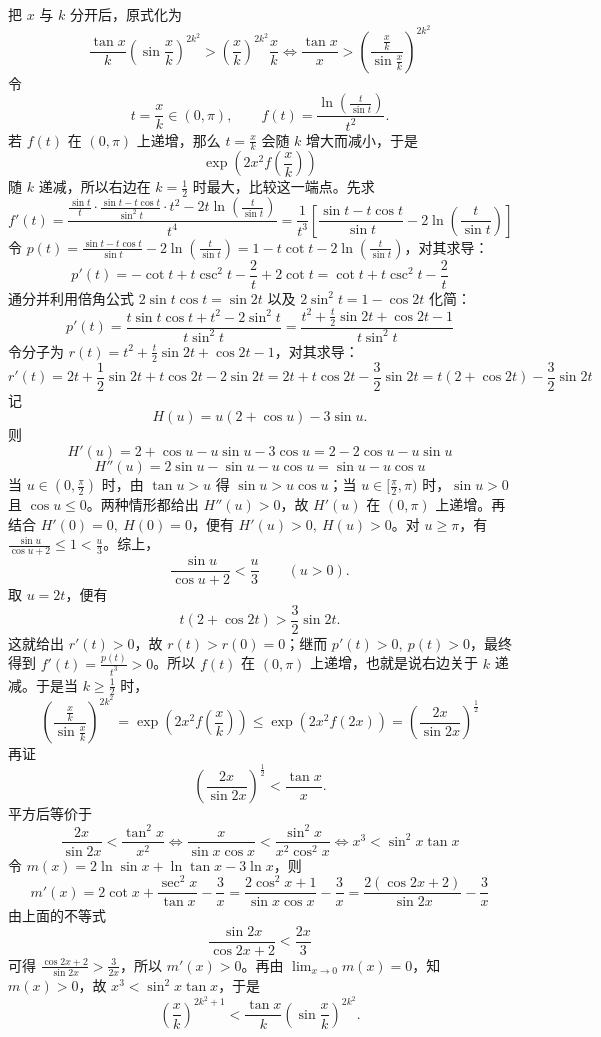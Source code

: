\begin{solution}
把 $x$ 与 $k$ 分开后，原式化为
$$ \frac{\tan x}{k} \left(\sin\frac{x}{k}\right)^{2k^2} > \left(\frac{x}{k}\right)^{2k^2} \frac{x}{k} \Leftrightarrow\frac{\tan x}{x} > \left( \frac{\frac{x}{k}}{\sin \frac{x}{k}} \right)^{2k^2} $$
令
\[
t=\frac{x}{k}\in(0,\pi),\qquad f(t)=\frac{\ln\left(\frac{t}{\sin t}\right)}{t^2}.
\]
若 $f(t)$ 在 $(0,\pi)$ 上递增，那么 $t=\frac{x}{k}$ 会随 $k$ 增大而减小，于是
\[
\exp\!\left(2x^2f\!\left(\frac{x}{k}\right)\right)
\]
随 $k$ 递减，所以右边在 $k=\frac12$ 时最大，比较这一端点。先求
$$ f'(t) = \frac{\frac{\sin t}{t} \cdot \frac{\sin t - t \cos t}{\sin^2 t} \cdot t^2 - 2t \ln\left(\frac{t}{\sin t}\right)}{t^4} = \frac{1}{t^3} \left[ \frac{\sin t - t \cos t}{\sin t} - 2 \ln\left(\frac{t}{\sin t}\right) \right] $$
令 $p(t) = \frac{\sin t - t \cos t}{\sin t} - 2 \ln\left(\frac{t}{\sin t}\right) = 1 - t \cot t - 2 \ln\left(\frac{t}{\sin t}\right)$，对其求导：
$$ p'(t) = -\cot t + t \csc^2 t - \frac{2}{t} + 2 \cot t = \cot t + t \csc^2 t - \frac{2}{t} $$
通分并利用倍角公式 $2\sin t \cos t = \sin 2t$ 以及 $2\sin^2 t = 1 - \cos 2t$ 化简：
$$ p'(t) = \frac{t \sin t \cos t + t^2 - 2 \sin^2 t}{t \sin^2 t} = \frac{t^2 + \frac{t}{2}\sin 2t + \cos 2t - 1}{t \sin^2 t} $$
令分子为 $r(t) = t^2 + \frac{t}{2}\sin 2t + \cos 2t - 1$，对其求导：
$$ r'(t) = 2t + \frac{1}{2}\sin 2t + t \cos 2t - 2\sin 2t = 2t + t \cos 2t - \frac{3}{2}\sin 2t = t(2 + \cos 2t) - \frac{3}{2}\sin 2t $$
记
\[
H(u) = u(2 + \cos u) - 3\sin u.
\]
则
$$ H'(u) = 2 + \cos u - u \sin u - 3 \cos u = 2 - 2 \cos u - u \sin u $$
$$ H''(u) = 2 \sin u - \sin u - u \cos u = \sin u - u \cos u $$
当 $u \in (0, \frac{\pi}{2})$ 时，由 $\tan u > u$ 得 $\sin u > u \cos u$；当 $u \in [\frac{\pi}{2}, \pi)$ 时，$\sin u > 0$ 且 $\cos u \leqslant 0$。两种情形都给出 $H''(u) > 0$，故 $H'(u)$ 在 $(0,\pi)$ 上递增。再结合 $H'(0)=0,\ H(0)=0$，便有 $H'(u)>0,\ H(u)>0$。对 $u\ge\pi$，有 $\frac{\sin u}{\cos u + 2} \le 1 < \frac{u}{3}$。综上，
\[
\frac{\sin u}{\cos u + 2} < \frac{u}{3}\qquad (u>0).
\]
取 $u=2t$，便有
\[
t(2 + \cos 2t) > \frac{3}{2}\sin 2t.
\]
这就给出 $r'(t) > 0$，故 $r(t) > r(0) = 0$；继而 $p'(t)>0,\ p(t)>0$，最终得到 $f'(t)=\frac{p(t)}{t^3}>0$。所以 $f(t)$ 在 $(0,\pi)$ 上递增，也就是说右边关于 $k$ 递减。于是当 $k \geqslant \frac{1}{2}$ 时，
$$ \left( \frac{\frac{x}{k}}{\sin \frac{x}{k}} \right)^{2k^2} = \exp\left(2x^2 f\left(\frac{x}{k}\right)\right) \leqslant \exp(2x^2 f(2x)) = \left(\frac{2x}{\sin 2x}\right)^{\frac{1}{2}} $$
再证
\[
\left(\frac{2x}{\sin 2x}\right)^{\frac{1}{2}} < \frac{\tan x}{x}.
\]
平方后等价于
$$ \frac{2x}{\sin 2x} < \frac{\tan^2 x}{x^2} \Longleftrightarrow \frac{x}{\sin x \cos x} < \frac{\sin^2 x}{x^2 \cos^2 x} \Longleftrightarrow x^3 < \sin^2 x \tan x $$
令 $m(x) = 2 \ln \sin x + \ln \tan x - 3 \ln x$，则
$$ m'(x) = 2 \cot x + \frac{\sec^2 x}{\tan x} - \frac{3}{x} = \frac{2\cos^2 x + 1}{\sin x \cos x} - \frac{3}{x} = \frac{2(\cos 2x + 2)}{\sin 2x} - \frac{3}{x} $$
由上面的不等式
\[
\frac{\sin 2x}{\cos 2x + 2} < \frac{2x}{3}
\]
可得 $\frac{\cos 2x + 2}{\sin 2x} > \frac{3}{2x}$，所以 $m'(x)>0$。再由 $\lim_{x\to 0} m(x)=0$，知 $m(x)>0$，故 $x^3 < \sin^2 x \tan x$，于是
\[
\left(\frac{x}{k}\right)^{2k^2+1} < \frac{\tan x}{k}\left(\sin\frac{x}{k}\right)^{2k^2}.
\]
\end{solution}

